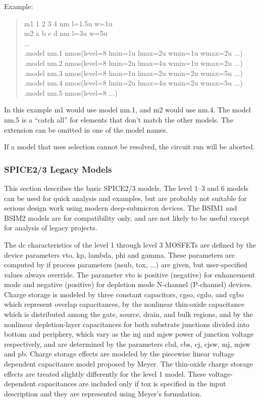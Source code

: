 Example:
\begin{quote}\vt
    m1 1 2 3 4 nm l=1.5u w=1u\\
    m2 a b c d nm l=3u w=5u\\
    ...\\
    .model nm.1 nmos(level=8 lmin=1u lmax=2u wmin=1u wmax=2u ...)\\
    .model nm.2 nmos(level=8 lmin=2u lmax=4u wmin=1u wmax=2u ...)\\
    .model nm.3 nmos(level=8 lmin=1u lmax=2u wmin=2u wmax=5u ...)\\
    .model nm.4 nmos(level=8 lmin=2u lmax=4u wmin=2u wmax=5u ...)\\
    .model nm.5 nmos(level=8 ...)\\
\end{quote}

In this example {\vt m1} would use model {\vt nm.1}, and {\vt m2}
would use {\vt nm.4}.  The model {\vt nm.5} is a ``catch all'' for
elements that don't match the other models.  The extension can be
omitted in one of the model names.

If a model that uses selection cannot be resolved, the circuit run
will be aborted.

\subsubsection{SPICE2/3 Legacy Models}

This section describes the basic SPICE2/3 models.  The level 1--3 and
6 models can be used for quick analysis and examples, but are probably
not suitable for serious design work using modern deep-submicron
devices.  The BSIM1 and BSIM2 models are for compatibility only, and
are not likely to be useful except for analysis of legacy projects.

The dc characteristics of the level 1 through level 3 MOSFETs are
defined by the device parameters {\vt vto}, {\vt kp}, {\vt lambda},
{\vt phi} and {\vt gamma}.  These parameters are computed by
{\WRspice} if process parameters ({\vt nsub}, {\vt tox}, ...) are
given, but user-specified values always override.  The parameter {\vt
vto} is positive (negative) for enhancement mode and negative
(positive) for depletion mode N-channel (P-channel) devices.  Charge
storage is modeled by three constant capacitors, {\vt cgso}, {\vt
cgdo}, and {\vt cgbo} which represent overlap capacitances, by the
nonlinear thin-oxide capacitance which is distributed among the gate,
source, drain, and bulk regions, and by the nonlinear depletion-layer
capacitances for both substrate junctions divided into bottom and
periphery, which vary as the {\vt mj} and {\vt mjsw} power of junction
voltage respectively, and are determined by the parameters {\vt cbd},
{\vt cbs}, {\vt cj}, {\vt cjsw}, {\vt mj}, {\vt mjsw} and {\vt pb}. 
Charge storage effects are modeled by the piecewise linear voltage
dependent capacitance model proposed by Meyer.  The thin-oxide charge
storage effects are treated slightly differently for the level 1
model.  These voltage-dependent capacitances are included only if {\vt
tox} is specified in the input description and they are represented
using Meyer's formulation.

